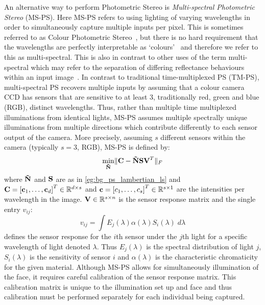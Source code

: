 An alternative
way to perform Photometric Stereo is
\textit{Multi-spectral Photometric Stereo} (MS-PS). Here MS-PS refers to
using lighting of varying wavelengths in order to simultaneously capture
multiple inputs per pixel. This is sometimes referred to as
Colour Photometric Stereo~\cite{petrov1987light,woodham1994gradient,%
kontsevich1994reconstruction,hernandez2007non},
but there is no hard requirement that the wavelengths are perfectly
interpretable as `colours'~\cite{fyffe2011single} and therefore we refer to this
as multi-spectral. This is also in contrast to other uses of the term multi-
spectral which may refer to the separation of differing reflectance behaviours
within an input image~\cite{nayar1997separation,mallick2005beyond,zickler2008color}.
In contrast to traditional time-multiplexed PS (TM-PS), multi-spectral PS
recovers multiple inputs by assuming that a colour camera CCD has sensors that
are sensitive to at least 3, traditionally red, green and blue (RGB), distinct
wavelengths. Thus, rather than multiple time multiplexed illuminations from
identical lights, MS-PS assumes multiple spectrally unique illuminations from
multiple directions which contribute differently to each sensor output
of the camera. More precisely, assuming $s$ different sensors within the camera
(typically $s = 3$, RGB), MS-PS is defined by:
\begin{equation}\label{eg:bg_ps_lambertian_ms_ps}
	 \min_{\boldsymbol{\mathbf{\tilde{N}}}} \lVert \boldsymbol{\mathbf{C}} - \boldsymbol{\mathbf{\tilde{N}}} \boldsymbol{\mathbf{S}} \boldsymbol{\mathbf{V}}^T \rVert_F
\end{equation}
where $\boldsymbol{\mathbf{\tilde{N}}}$ and $\boldsymbol{\mathbf{S}}$ are as in \cref{eg:bg_ps_lambertian_ls}
and $\boldsymbol{\mathbf{C}} = {[\boldsymbol{\mathbf{c}}_1, \ldots, \boldsymbol{\mathbf{c}}_d]}^T \in \mathbb{R}^{d \times s}$ and
$\boldsymbol{\mathbf{c}} = {[c_1, \ldots, c_s]}^T \in \mathbb{R}^{s \times 1}$ are the intensities
per wavelength in the image. $\boldsymbol{\mathbf{V}} \in \mathbb{R}^{s \times n}$ is the sensor
response matrix and the single entry $v_{ij}$:
\begin{equation}\label{eg:bg_ps_sensor_response}
	v_{ij} = \int E_j(\lambda) \alpha(\lambda) S_i(\lambda) \; d\lambda
\end{equation}
defines the sensor response for the $i$th sensor under the $j$th light for
a specific wavelength of light denoted $\lambda$. Thus $E_j(\lambda)$ is the
spectral distribution of light $j$, $S_i(\lambda)$ is the sensitivity
of sensor $i$ and $\alpha(\lambda)$ is the characteristic chromaticity for the
given material. Although MS-PS allows for simultaneously illumination of the
face, it requires careful calibration of the sensor response matrix. This
calibration matrix is unique to the illumination set up and face and thus
calibration must be performed separately for each individual
being captured.

